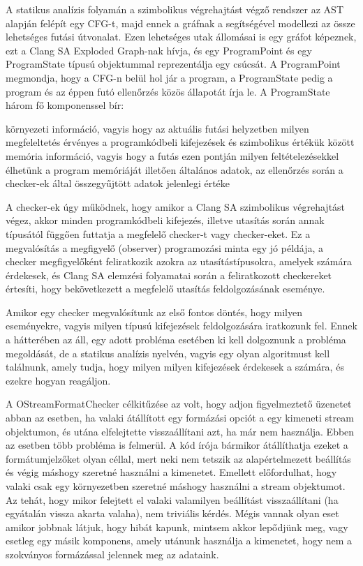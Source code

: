 \documentclass[a4paper,12pt]{report}
\begin{document}
A statikus analízis folyamán a szimbolikus végrehajtást végző rendszer az AST alapján felépít egy CFG-t, majd ennek a gráfnak a segítségével modellezi az össze lehetséges futási útvonalat. Ezen lehetséges utak állomásai is egy gráfot képeznek, ezt a Clang SA Exploded Graph-nak hívja, és egy ProgramPoint és egy ProgramState típusú objektummal reprezentálja egy csúcsát. A ProgramPoint megmondja, hogy a CFG-n belül hol jár a program, a ProgramState pedig a program és az éppen futó ellenőrzés közös állapotát írja le. A ProgramState három fő komponenssel bír:

környezeti információ, vagyis hogy az aktuális futási helyzetben milyen megfeleltetés érvényes a programkódbeli kifejezések és szimbolikus értékük között
memória információ, vagyis hogy a futás ezen pontján milyen feltételezésekkel élhetünk a program memóriáját illetően
általános adatok, az ellenőrzés során a checker-ek által összegyűjtött adatok jelenlegi értéke

A checker-ek úgy működnek, hogy amikor a Clang SA szimbolikus végrehajtást végez, akkor minden programkódbeli kifejezés, illetve utasítás során annak típusától függően futtatja a megfelelő checker-t vagy checker-eket. Ez a megvalósítás a megfigyelő (observer) programozási minta egy jó példája, a checker megfigyelőként feliratkozik azokra az utasítástípusokra, amelyek számára érdekesek, és Clang SA elemzési folyamatai során a feliratkozott checkereket értesíti, hogy bekövetkezett a megfelelő utasítás feldolgozásának eseménye.

Amikor egy checker megvalósítunk az első fontos döntés, hogy milyen eseményekre, vagyis milyen típusú kifejezések feldolgozására iratkozunk fel. Ennek a hátterében az áll, egy adott probléma esetében ki kell dolgoznunk a probléma megoldását, de a statikus analízis nyelvén, vagyis egy olyan algoritmust kell találnunk, amely tudja, hogy milyen milyen kifejezések érdekesek a számára, és ezekre hogyan reagáljon.

A OStreamFormatChecker célkitűzése az volt, hogy adjon figyelmeztető üzenetet abban az esetben, ha valaki átállított egy formázási opciót a egy kimeneti stream objektumon, és utána elfelejtette visszaállítani azt, ha már nem használja. Ebben az esetben több probléma is felmerül. A kód írója bármikor átállíthatja ezeket a formátumjelzőket olyan céllal, mert neki nem tetszik az alapértelmezett beállítás és végig máshogy szeretné használni a kimenetet. Emellett előfordulhat, hogy valaki csak egy környezetben szeretné máshogy használni a stream objektumot. Az tehát, hogy mikor felejtett el valaki valamilyen beállítást visszaállítani (ha egyátalán vissza akarta valaha), nem triviális kérdés. Mégis vannak olyan eset amikor jobbnak látjuk, hogy hibát kapunk, mintsem akkor lepődjünk meg, vagy esetleg egy másik komponens, amely utánunk használja a kimenetet, hogy nem a szokványos formázással jelennek meg az adataink.
\end{document}
